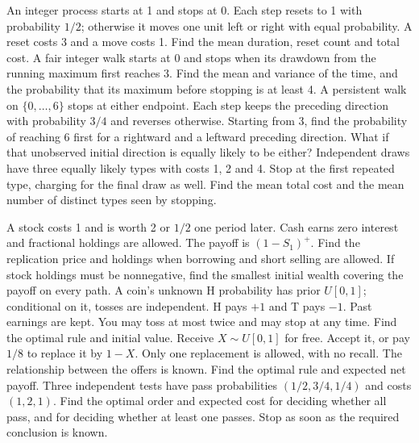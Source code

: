 An integer process starts at 1 and stops at 0. Each step resets to 1 with probability $1/2$; otherwise it moves one unit left or right with equal probability. A reset costs 3 and a move costs 1. Find the mean duration, reset count and total cost.
A fair integer walk starts at 0 and stops when its drawdown from the running maximum first reaches 3. Find the mean and variance of the time, and the probability that its maximum before stopping is at least 4.
A persistent walk on $\{0,\ldots,6\}$ stops at either endpoint. Each step keeps the preceding direction with probability $3/4$ and reverses otherwise. Starting from 3, find the probability of reaching 6 first for a rightward and a leftward preceding direction. What if that unobserved initial direction is equally likely to be either?
Independent draws have three equally likely types with costs 1, 2 and 4. Stop at the first repeated type, charging for the final draw as well. Find the mean total cost and the mean number of distinct types seen by stopping.

A stock costs 1 and is worth 2 or $1/2$ one period later. Cash earns zero interest and fractional holdings are allowed. The payoff is $(1-S_1)^+$. Find the replication price and holdings when borrowing and short selling are allowed. If stock holdings must be nonnegative, find the smallest initial wealth covering the payoff on every path.
A coin's unknown H probability has prior $U[0,1]$; conditional on it, tosses are independent. H pays $+1$ and T pays $-1$. Past earnings are kept. You may toss at most twice and may stop at any time. Find the optimal rule and initial value.
Receive $X\sim U[0,1]$ for free. Accept it, or pay $1/8$ to replace it by $1-X$. Only one replacement is allowed, with no recall. The relationship between the offers is known. Find the optimal rule and expected net payoff.
Three independent tests have pass probabilities $(1/2,3/4,1/4)$ and costs $(1,2,1)$. Find the optimal order and expected cost for deciding whether all pass, and for deciding whether at least one passes. Stop as soon as the required conclusion is known.

